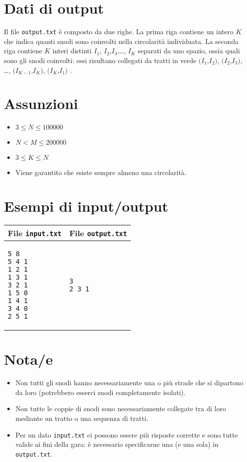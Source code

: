 \documentclass[a4paper,11pt]{article}
\begin{document}
\section*{Dati di output}
  
Il file \texttt{output.txt} è composto da due righe.  La
prima riga contiene un intero $K$ che indica quanti snodi
sono coinvolti nella circolarità individuata. La seconda riga
contiene $K$ interi distinti $I_{1}$,
$I_{2}$,$I_{3}$,…,
$I_{K}$ separati da uno spazio, ossia quali sono gli
snodi coinvolti: essi risultano collegati da tratti in verde
$(I_{1}$,$I_{2}$$)$,
$(I_{2}$,$I_{3}$$)$,
…,
$(I_{K-1}$,$I_{K}$$)$,
$(I_{K}$,$I_{1}$$)$ .

  \section*{Assunzioni}
  \begin{itemize}
  
    \item $3 ≤ N ≤ 100 000$
    \item $N < M ≤ 200 000$
    \item $3 ≤ K ≤ N$
    \item Viene garantito che esiste sempre almeno una circolarità.
  \end{itemize}

\section*{Esempi di input/output}

  
    \noindent
    \begin{tabular}{p{11cm}|p{5cm}}
    \toprule
    \textbf{File \texttt{input.txt}}
    & \textbf{File \texttt{output.txt}}
    \\
    \midrule
    \scriptsize
    \begin{verbatim}
5 8
5 4 1
1 2 1
1 3 1
3 2 1
1 5 0
1 4 1
3 4 0
2 5 1
\end{verbatim}
    &
    \scriptsize
    \begin{verbatim}
3
2 3 1
\end{verbatim}
    \\
    \bottomrule
    \end{tabular}
  
\section*{Nota/e}
\begin{itemize}
  
    \item  Non tutti gli snodi hanno necessariamente una o più strade che si
  dipartono da loro (potrebbero esserci snodi completamente isolati).
    \item  Non tutte le coppie di snodi sono necessariamente collegate tra
  di loro mediante un tratto o una sequenza di tratti.
    \item  Per un dato \texttt{input.txt} ci possono essere più
  risposte corrette e sono tutte valide ai fini della gara: è necessario
  specificarne una (e una sola) in \texttt{output.txt}.
\end{itemize}
\end{document}
